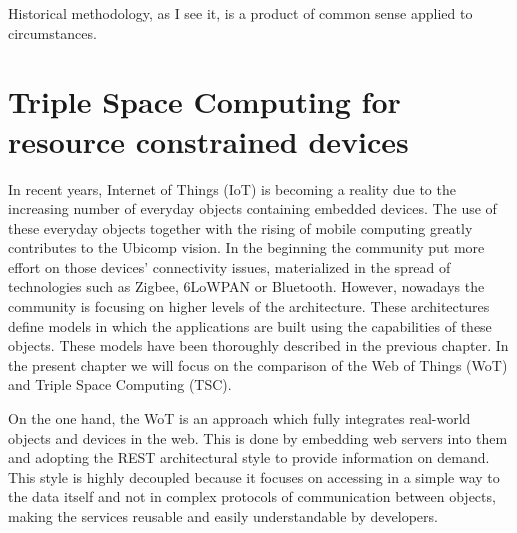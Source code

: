 

\begin{savequote}[50mm]
Historical methodology, as I see it, is a product of common sense applied to circumstances. 
\end{savequote}


\chapter{Triple Space Computing for resource constrained devices}
\label{cha:tsc}

\ifpdf
    \graphicspath{{3_overall_methodology/figures/PNG/}{3_overall_methodology/figures/PDF/}{3_overall_methodology/figures/}}
\else
    \graphicspath{{3_overall_methodology/figures/EPS/}{3_overall_methodology/figures/}}
\fi




In recent years, Internet of Things (IoT) is becoming a reality due to the increasing number of everyday objects containing embedded devices.
The use of these everyday objects together with the rising of mobile computing greatly contributes to the Ubicomp vision.
In the beginning the community put more effort on those devices' connectivity issues, materialized in the spread of technologies such as Zigbee, 6LoWPAN or Bluetooth.
However, nowadays the community is focusing on higher levels of the architecture.
These architectures define models in which the applications are built using the capabilities of these objects.
These models have been thoroughly described in the previous chapter.
In the present chapter we will focus on the comparison of the Web of Things (WoT) and Triple Space Computing (TSC).

On the one hand, the WoT is an approach which fully integrates real-world objects and devices in the web.
This is done by embedding web servers into them and adopting the REST architectural style to provide information on demand.
This style is highly decoupled because it focuses on accessing in a simple way to the data itself and not in complex protocols of communication between objects, making the services reusable and easily understandable by developers.

